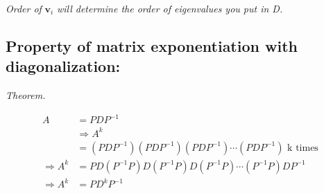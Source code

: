 \documentclass[12pt]{article}
\theoremstyle{plain}
\theoremstyle{remark}
\theoremstyle{definition}
\begin{document}
\emph{Order of} \({\mathbf{v}}_{i}\) \emph{will determine the order
of eigenvalues you put in D.}


\subsection{Property of matrix exponentiation with
diagonalization:}

\emph{Theorem.}

\begin{align*}
A &= PDP^{- 1} \\
&\Rightarrow A^{k}  \\
&= \left( PDP^{- 1} \right)\left( PDP^{- 1} \right)\left( PDP^{- 1} \right)\cdots\left( PDP^{- 1} \right)\text{\ k\ }\text{times} \\
\Rightarrow A^{k} &= PD\left( P^{- 1}P \right)D\left( P^{- 1}P \right)D\left( P^{- 1}P \right)\cdots\left( P^{- 1}P \right)DP^{- 1} \\
\Rightarrow A^{k} &= PD^{k}P^{- 1}
\end{align*}
\end{document}
